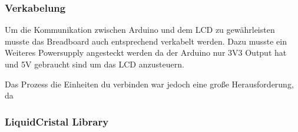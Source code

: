 \documentclass{scrartcl}
\begin{document}

\subsubsection{Verkabelung}


Um die Kommunikation zwischen Arduino und dem LCD zu gewährleisten musste das Breadboard auch entsprechend verkabelt werden. Dazu musste ein Weiteres Powersupply angesteckt werden da der Arduino nur 3V3 Output hat und 5V gebraucht sind um das LCD anzusteuern.

Das Prozess die Einheiten du verbinden war jedoch eine große Herausforderung, da 


\subsubsection{LiquidCristal Library}

%
%
\end{document}
